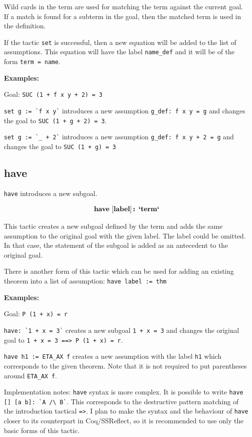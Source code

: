 \documentclass[a4paper]{article}
\newcommand{\xx}[1]{\mathop{\text{\bf #1}}}
\begin{document}
Wild cards in the term are used for matching the term against the current goal. If a match is found for a subterm in the goal, then the matched term is used in the definition.

If the tactic \verb|set| is successful, then a new equation will be added to the list of assumptions. This equation will have the label \verb|name_def| and it will be of the form \verb|term = name|.

{\bf Examples:}

Goal: \verb|SUC (1 + f x y + 2) = 3|

\verb|set g := `f x y`| introduces a new assumption \verb|g_def: f x y = g| and changes the goal to \verb|SUC (1 + g + 2) = 3|.

\verb|set g := `_ + 2`| introduces a new assumption \verb|g_def: f x y + 2 = g| and changes the goal to \verb|SUC (1 + g) = 3|


\subsection{have}
\verb|have| introduces a new subgoal.

$$\xx{have}\ [\xx{label}]\xx{:}\ \xx{`term`}$$

This tactic creates a new subgoal defined by the term and adds the same assumption to the original goal with the given label. The label could be omitted. In that case, the statement of the subgoal is added as an antecedent to the original goal.

There is another form of this tactic which can be used for adding an existing theorem into a list of assumption: \verb$have label := thm$

{\bf Examples:}

Goal: \verb|P (1 + x) = r|

\verb|have: `1 + x = 3`| creates a new subgoal \verb|1 + x = 3| and changes the original goal to \verb|1 + x = 3 ==> P (1 + x) = r|.

\verb|have h1 := ETA_AX f| creates a new assumption with the label \verb|h1| which corresponds to the given theorem. Note that it is not required to put parentheses around \verb|ETA_AX f|.


Implementation notes: \verb|have| syntax is more complex. It is possible to write \verb|have [] [a b]: `A /\ B`|. This corresponds to the destructive pattern matching of the introduction tactical \verb|=>|. I plan to make the syntax and the behaviour of \verb|have| closer to its counterpart in Coq/SSReflect, so it is recommended to use only the basic forms of this tactic.
\end{document}
